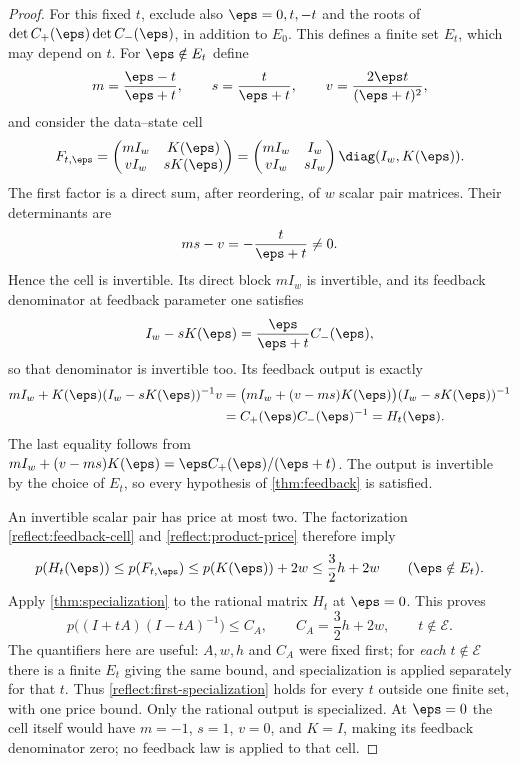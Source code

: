 \begin{proof}
For this fixed $t$, exclude also $\eps=0,t,-t$ and the roots of
$\det C_+(\eps)\det C_-(\eps)$, in addition to $E_0$.
This defines a finite set $E_t$, which may depend on $t$.
For $\eps\notin E_t$ define
\[
 m=\frac{\eps-t}{\eps+t},\qquad
 s=\frac{t}{\eps+t},\qquad
 v=\frac{2\eps t}{(\eps+t)^2},
\]
and consider the data--state cell
\begin{equation}
 F_{t,\eps}=
 \begin{pmatrix}mI_w&K(\eps)\\vI_w&sK(\eps)\end{pmatrix}
 =\begin{pmatrix}mI_w&I_w\\vI_w&sI_w\end{pmatrix}
   \diag(I_w,K(\eps)).
 \label{reflect:feedback-cell}
\end{equation}
The first factor is a direct sum, after reordering, of $w$ scalar
pair matrices.  Their determinants are
\[
 ms-v=-\frac{t}{\eps+t}\ne0.
\]
Hence the cell is invertible.  Its direct block $mI_w$ is invertible,
and its feedback denominator at feedback parameter one satisfies
\begin{equation}
 I_w-sK(\eps)=\frac{\eps}{\eps+t}C_-(\eps),
 \label{reflect:feedback-denominator}
\end{equation}
so that denominator is invertible too.  Its feedback output is exactly
\begin{align*}
 mI_w+K(\eps)(I_w-sK(\eps))^{-1}v
 &=\bigl(mI_w+(v-ms)K(\eps)\bigr)
                         (I_w-sK(\eps))^{-1}\\
 &=C_+(\eps)C_-(\eps)^{-1}=H_t(\eps).
\end{align*}
The last equality follows from
$mI_w+(v-ms)K(\eps)=\eps C_+(\eps)/(\eps+t)$.
The output is invertible by the choice of $E_t$, so every hypothesis
of \cref{thm:feedback} is satisfied.

An invertible scalar pair has price at most two.  The factorization
\eqref{reflect:feedback-cell} and \eqref{reflect:product-price}
therefore imply
\[
 p(H_t(\eps))\leq p(F_{t,\eps})
              \leq p(K(\eps))+2w
              \leq \frac32h+2w
              \qquad(\eps\notin E_t).
\]
Apply \cref{thm:specialization} to the rational matrix $H_t$ at
$\eps=0$.  This proves
\begin{equation}
 p\bigl((I+tA)(I-tA)^{-1}\bigr)\leq C_A,
 \qquad C_A=\frac32h+2w,
 \qquad t\notin\mathcal E.
 \label{reflect:first-specialization}
\end{equation}
The quantifiers here are useful: $A,w,h$ and $C_A$ were fixed first;
for \emph{each} $t\notin\mathcal E$ there is a finite $E_t$ giving
the same bound, and specialization is applied separately for that
$t$.  Thus \eqref{reflect:first-specialization} holds for every
$t$ outside one finite set, with one price bound.
Only the rational output is specialized.  At $\eps=0$ the cell
itself would have $m=-1$, $s=1$, $v=0$, and $K=I$, making its
feedback denominator zero; no feedback law is applied to that cell.


\end{proof}

